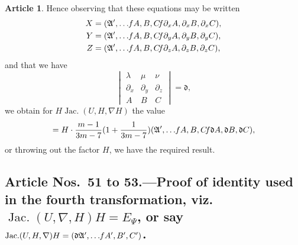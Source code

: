 \documentclass[12pt,a4paper]{article}
\theoremstyle{definition}
\newtheorem{art}{Article}[section]
\DeclareMathOperator{\Jac}{Jac.}
\begin{document}
\begin{art}
Hence observing that these equations may be written
\begin{align*}
X &= (\mathfrak{A}', \ldots \hspace{-2pt} fA, B, C \hspace{-2pt} f\partial_x A, \partial_x B, \partial_x C), \\
Y &= (\mathfrak{A}', \ldots \hspace{-2pt} fA, B, C \hspace{-2pt} f\partial_y A, \partial_y B, \partial_y C), \\
Z &= (\mathfrak{A}', \ldots \hspace{-2pt} fA, B, C \hspace{-2pt} f\partial_z A, \partial_z B, \partial_z C),
\end{align*}
and that we have
\[
\begin{vmatrix} \lambda & \mu & \nu \\ \partial_x & \partial_y & \partial_z \\ A & B & C \end{vmatrix} = \mathfrak{d},
\]
we obtain for $H\Jac(U, H, \nabla H)$ the value
\[
= H \cdot \frac{m - 1}{3m - 7}(1 + \frac{1}{3m - 7})(\mathfrak{A}', \ldots \hspace{-2pt} fA, B, C \hspace{-2pt} f\mathfrak{d}A, \mathfrak{d}B, \mathfrak{d}C),
\]
or throwing out the factor $H$, we have the required result.
\end{art}

\subsection*{Article Nos.\ 51 to 53.---Proof of identity used in the fourth transformation, viz.\ $\Jac(U, \nabla, H)H = E_\Psi$, or say $\Jac(U, H, \nabla)H = (\mathfrak{d}\mathfrak{A}', \ldots \hspace{-2pt} fA', B', C')$.}
\end{document}
